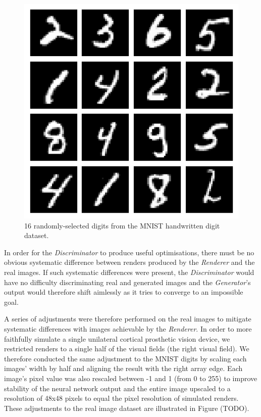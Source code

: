 \documentclass[11pt]{book}
\begin{document}
\begin{figure}[htbp]
\centering
\includegraphics[width=.9\linewidth]{./images/mnist_samples.png}
\caption{\label{fig:org593149f}
16 randomly-selected digits from the MNIST handwritten digit dataset.}
\end{figure}

In order for the \emph{Discriminator} to produce useful optimisations, there must be no obvious systematic difference between renders produced by the \emph{Renderer} and the real images.
If such systematic differences were present, the \emph{Discriminator} would have no difficulty discriminating real and generated images and the \emph{Generator}'s output would therefore shift aimlessly as it tries to converge to an impossible goal.

A series of adjustments were therefore performed on the real images to mitigate systematic differences with images achievable by the \emph{Renderer}.
In order to more faithfully simulate a single unilateral cortical prosthetic vision device, we restricted renders to a single half of the visual fields (the right visual field).
We therefore conducted the same adjustment to the MNIST digits by scaling each images' width by half and aligning the result with the right array edge.
Each image's pixel value was also rescaled between -1 and 1 (from 0 to 255) to improve stability of the neural network output and the entire image upscaled to a resolution of 48x48 pixels to equal the pixel resolution of simulated renders.
These adjustments to the real image dataset are illustrated in Figure (TODO).
\end{document}
